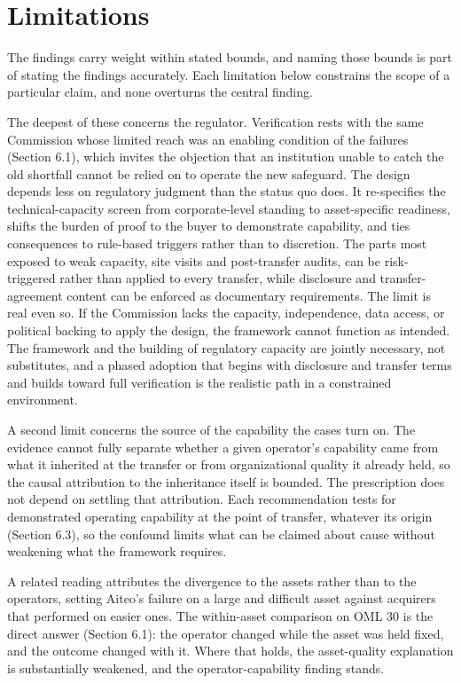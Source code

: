 \hypertarget{limitations}{%
\section{Limitations}\label{limitations}}

The findings carry weight within stated bounds, and naming those bounds
is part of stating the findings accurately. Each limitation below
constrains the scope of a particular claim, and none overturns the
central finding.

The deepest of these concerns the regulator. Verification rests with the
same Commission whose limited reach was an enabling condition of the
failures (Section 6.1), which invites the objection that an institution
unable to catch the old shortfall cannot be relied on to operate the new
safeguard. The design depends less on regulatory judgment than the
status quo does. It re-specifies the technical-capacity screen from
corporate-level standing to asset-specific readiness, shifts the burden
of proof to the buyer to demonstrate capability, and ties consequences
to rule-based triggers rather than to discretion. The parts most exposed
to weak capacity, site visits and post-transfer audits, can be
risk-triggered rather than applied to every transfer, while disclosure
and transfer-agreement content can be enforced as documentary
requirements. The limit is real even so. If the Commission lacks the
capacity, independence, data access, or political backing to apply the
design, the framework cannot function as intended. The framework and the
building of regulatory capacity are jointly necessary, not substitutes,
and a phased adoption that begins with disclosure and transfer terms and
builds toward full verification is the realistic path in a constrained
environment.

A second limit concerns the source of the capability the cases turn on.
The evidence cannot fully separate whether a given operator's capability
came from what it inherited at the transfer or from organizational
quality it already held, so the causal attribution to the inheritance
itself is bounded. The prescription does not depend on settling that
attribution. Each recommendation tests for demonstrated operating
capability at the point of transfer, whatever its origin (Section 6.3),
so the confound limits what can be claimed about cause without weakening
what the framework requires.

A related reading attributes the divergence to the assets rather than to
the operators, setting Aiteo's failure on a large and difficult asset
against acquirers that performed on easier ones. The within-asset
comparison on OML 30 is the direct answer (Section 6.1): the operator
changed while the asset was held fixed, and the outcome changed with it.
Where that holds, the asset-quality explanation is substantially
weakened, and the operator-capability finding stands.

